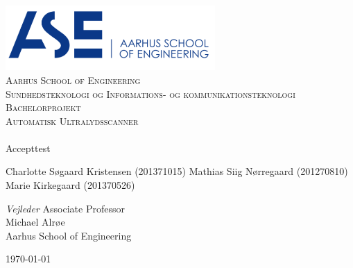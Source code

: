 \begin{titlingpage}
\begin{center}

~ \\[3cm]

\includegraphics[width=0.6\textwidth]{figurer/ASE}~\\[1cm]

\textsc{\LARGE Aarhus School of Engineering}\\[1.5cm]

\textsc{\Large Sundhedsteknologi og Informations- og kommunikationsteknologi}\\

\textsc{\Large Bachelorprojekt}\\[0.5cm]

\textsc{\Large Automatisk Ultralydsscanner} \\[1cm]

\noindent\makebox[\linewidth]{\rule{\textwidth}{0.4pt}}\\
[0.5cm]{\Huge Accepttest}
\noindent\makebox[\linewidth]{\rule{\textwidth}{0.4pt}}

\end{center}

Charlotte Søgaard Kristensen (201371015) \newline
Mathias Siig Nørregaard  (201270810)\newline		 
Marie Kirkegaard (201370526) \newline  


\textit{Vejleder} \newline
Associate Professor\\
Michael Alrøe\\
Aarhus School of Engineering


\vfill

\begin{center}
{\large \today}
\end{center}

\end{titlingpage}